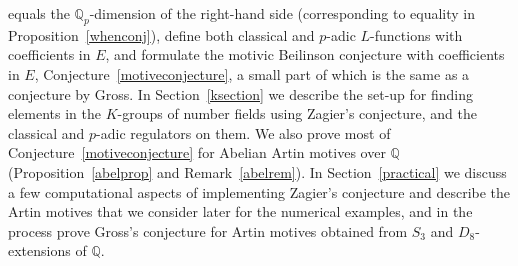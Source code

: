 \documentclass{amsart}
\begin{document}
equals the $ {{\mathbb Q_p}} $-dimension of the right-hand side (corresponding to equality in Proposition~\ref{whenconj}),
define both classical and {$p$-adic{\futurelet{}}} {$L$-functions{\futurelet{}}} with coefficients in $ E $, and formulate the motivic Beilinson
conjecture with coefficients in $ E $, Conjecture~\ref{motiveconjecture}, a small part of which is the
same as a conjecture by Gross.
In Section~\ref{ksection} we describe the set-up for finding elements in the $ K $-groups of number fields
using Zagier's conjecture, and the classical and {$p$-adic{\futurelet{}}} regulators on them.
We also prove most of Conjecture~\ref{motiveconjecture} for Abelian Artin motives over $ {\mathbb Q} $ (Proposition~\ref{abelprop}
and Remark~\ref{abelrem}).
In Section~\ref{practical} we discuss a few computational aspects of implementing Zagier's conjecture
and describe the Artin motives that we consider later for the numerical examples,
and in the process prove Gross's conjecture for Artin motives obtained from $ S_3 $ and $ D_8 $-extensions of $ {\mathbb Q} $. 
\end{document}
